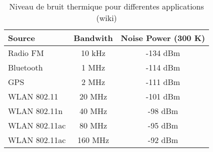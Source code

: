 \begin{table}
    \caption{Niveau de bruit thermique pour differentes applications (wiki)}
    \begin{tabular}{l|c|c}
        \toprule
        Source & Bandwith & Noise Power (300 K) \\
        \midrule
        \hline
        Radio FM & 10 kHz & -134 dBm \\
        Bluetooth & 1 MHz & -114 dBm \\
        GPS & 2 MHz & -111 dBm \\
        WLAN 802.11 & 20 MHz & -101 dBm \\
        WLAN 802.11n & 40 MHz & -98 dBm \\
        WLAN 802.11ac & 80 MHz & -95 dBm \\
        WLAN 802.11ac & 160 MHz & -92 dBm \\
        \bottomrule
    \end{tabular}
\end{table}